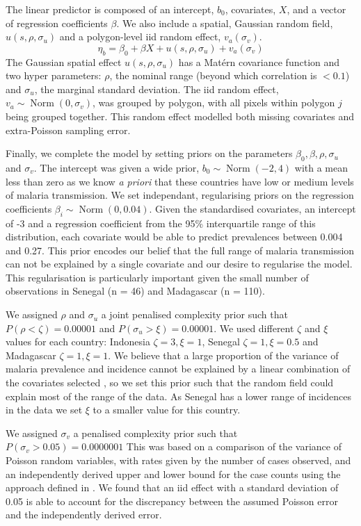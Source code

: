 \documentclass{statsoc}
\begin{document}
The linear predictor is composed of an intercept, $b_0$, covariates, $X$, and a vector of regression coefficients $\beta$.
We also include a spatial, Gaussian random field, $u(s, \rho, \sigma_u)$ and a polygon-level iid random effect, $ v_a(\sigma_v)$.
$$\eta_b = \beta_0 + \beta X  + u(s, \rho, \sigma_u) + v_a(\sigma_v) $$
The Gaussian spatial effect $u(s, \rho, \sigma_u)$ has a Mat\'ern covariance function and two hyper parameters: $\rho$, the nominal range (beyond which correlation is $< 0.1$) and $\sigma_u$, the marginal standard deviation.
The iid random effect, $v_a \sim \operatorname{Norm}(0, \sigma_v)$,  was grouped by polygon, with all pixels within polygon $j$ being grouped together.
This random effect modelled both missing covariates and extra-Poisson sampling error.


Finally, we complete the model by setting priors on the parameters $\beta_0, \beta, \rho, \sigma_u$ and $\sigma_v$.
The intercept was given a wide prior, $b_0 \sim \operatorname{Norm}(-2, 4)$ with a mean less than zero as we know \emph{a priori} that these countries have low or medium levels of malaria transmission.
We set independant, regularising priors on the regression coefficients $\beta_i \sim \operatorname{Norm}(0, 0.04)$. 
Given the standardised covariates, an intercept of -3 and a regression coefficient from the 95\% interquartile range of this distribution, each covariate would be able to predict prevalences between 0.004 and 0.27. 
This prior encodes our belief that the full range of malaria transmission can not be explained by a single covariate and our desire to regularise the model.
This regularisation is particularly important given the small number of observations in Senegal (n = 46) and Madagascar (n = 110).

We assigned $\rho$ and $\sigma_u$ a joint penalised complexity prior \citep{fuglstad2018constructing} such that $P(\rho < \zeta) = 0.00001$ and $P(\sigma_u > \xi) = 0.00001$.
We used different $\zeta$  and $\xi$ values for each country: Indonesia $\zeta = 3, \xi = 1$, Senegal $\zeta = 1, \xi = 0.5$ and Madagascar $\zeta = 1, \xi = 1$.
We believe that a large proportion of the variance of malaria prevalence and incidence cannot be explained by a linear combination of the covariates selected \citep{bhatt2017improved}, so we set this prior such that the random field could explain most of the range of the data.
As Senegal has a lower range of incidences in the data we set $\xi$ to a smaller value for this country.

We assigned $\sigma_v$ a penalised complexity prior \citep{simpson2017penalising} such that $P(\sigma_v > 0.05) = 0.0000001$
This was based on a comparison of the variance of Poisson random variables, with rates given by the number of cases observed, and an independently derived upper and lower bound for the case counts using the approach defined in \citep{cibulskis2011worldwide}.
We found that an iid effect with a standard deviation of 0.05 is able to account for the discrepancy between the assumed Poisson error and the independently derived error.
\end{document}

